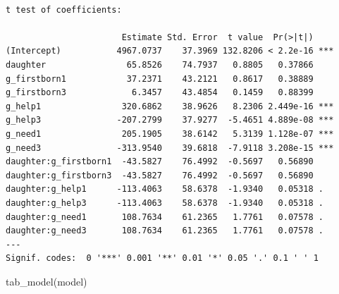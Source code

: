 \documentclass[
  letterpaper,
  DIV=11,
  numbers=noendperiod]{scrartcl}
\newenvironment{Shaded}{\begin{snugshade}}{\end{snugshade}}
\newcommand{\FunctionTok}[1]{\textcolor[rgb]{0.28,0.35,0.67}{#1}}
\newcommand{\NormalTok}[1]{\textcolor[rgb]{0.00,0.23,0.31}{#1}}
\begin{document}
\begin{verbatim}

t test of coefficients:

                       Estimate Std. Error  t value  Pr(>|t|)    
(Intercept)           4967.0737    37.3969 132.8206 < 2.2e-16 ***
daughter                65.8526    74.7937   0.8805   0.37866    
g_firstborn1            37.2371    43.2121   0.8617   0.38889    
g_firstborn3             6.3457    43.4854   0.1459   0.88399    
g_help1                320.6862    38.9626   8.2306 2.449e-16 ***
g_help3               -207.2799    37.9277  -5.4651 4.889e-08 ***
g_need1                205.1905    38.6142   5.3139 1.128e-07 ***
g_need3               -313.9540    39.6818  -7.9118 3.208e-15 ***
daughter:g_firstborn1  -43.5827    76.4992  -0.5697   0.56890    
daughter:g_firstborn3  -43.5827    76.4992  -0.5697   0.56890    
daughter:g_help1      -113.4063    58.6378  -1.9340   0.05318 .  
daughter:g_help3      -113.4063    58.6378  -1.9340   0.05318 .  
daughter:g_need1       108.7634    61.2365   1.7761   0.07578 .  
daughter:g_need3       108.7634    61.2365   1.7761   0.07578 .  
---
Signif. codes:  0 '***' 0.001 '**' 0.01 '*' 0.05 '.' 0.1 ' ' 1
\end{verbatim}

\begin{Shaded}
\begin{Highlighting}[]
\FunctionTok{tab\_model}\NormalTok{(model)}
\end{Highlighting}
\end{Shaded}
\end{document}
